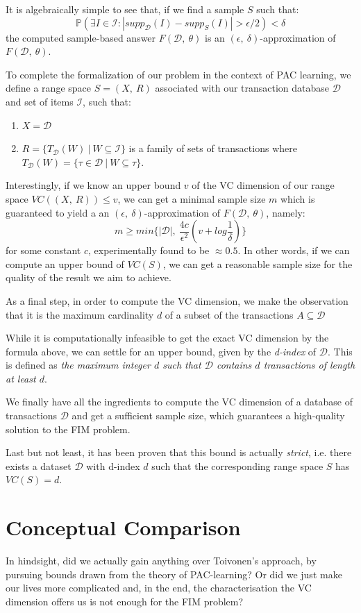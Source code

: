 \documentclass[11pt]{sigplanconf}
\renewcommand\it{\textit}
\newcommand\I{\mathcal{I}}
\newcommand\D{\mathcal{D}}
\renewcommand\P{\mathds{P}}
\begin{document}
It is algebraically simple to see that, if we find a sample $S$ such that:
\[ \P(\exists I \in \I : |supp_{\D}(I) - supp_S(I)| > \epsilon/2) < \delta
\]
the computed sample-based answer $F(\D,\ \theta)$ is an $(\epsilon,\ \delta)$-approximation of $F(\D,\ \theta)$.

To complete the formalization of our problem in the context of PAC learning, we define a range space $S=(X,\ R)$ associated with our transaction database $\D$ and set of items $\I$, such that:
\begin{enumerate}
\item $X = \D$
\item $R = \{ T_{\D}(W) \ | \ W \subseteq \I \}$ is a family of sets of transactions where
$T_{\D}(W) = \{ \tau \in \D \ | \ W \subseteq \tau \}$.
\end{enumerate}

Interestingly, if we know an upper bound $v$ of the VC dimension of our range space $VC((X,\ R)) \leq v$, we can get a minimal sample size $m$ which is guaranteed to yield a an $(\epsilon,\ \delta)$-approximation of $F(\D,\ \theta)$, namely:
\[ m \geq min\{ |\D|,\ \frac{4c}{\epsilon^2}(v + log\frac{1}{\delta}) \}
\]
for some constant $c$, experimentally found to be $\approx 0.5$.
In other words, if we can compute an upper bound of $VC(S)$, we can get a reasonable sample size for  the quality of the result we aim to achieve.

As a final step, in order to compute the VC dimension, we make the observation that it is the maximum cardinality $d$ of a subset of the transactions $A \subseteq \D$ 

While it is computationally infeasible to get the exact VC dimension by the formula above, we can settle for an upper bound, given by the \it{d-index} of $\D$. This is defined as \it{the maximum integer $d$ such that $\D$ contains $d$ transactions of length at least $d$}.

We finally have all the ingredients to compute the VC dimension of a database of transactions $\D$ and get a sufficient sample size, which guarantees a high-quality solution to the FIM problem.

Last but not least, it has been proven that this bound is actually \it{strict}, i.e. there exists a dataset $\D$ with d-index $d$ such that the corresponding range space $S$ has $VC(S)=d$.

\section{Conceptual Comparison}
In hindsight, did we actually gain anything over Toivonen's approach, by pursuing bounds drawn from the theory of PAC-learning? Or did we just make our lives more complicated and, in the end, the characterisation the VC dimension offers us is not enough for the FIM problem?
\end{document}
